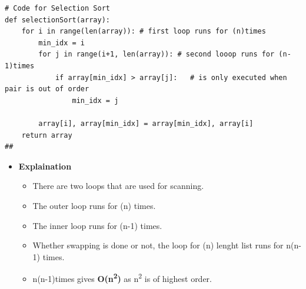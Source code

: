 \documentclass{article}
\begin{document}
\begin{verbatim}
# Code for Selection Sort
def selectionSort(array):
    for i in range(len(array)): # first loop runs for (n)times
        min_idx = i
        for j in range(i+1, len(array)): # second looop runs for (n-1)times
            if array[min_idx] > array[j]:   # is only executed when pair is out of order
                min_idx = j
    
        array[i], array[min_idx] = array[min_idx], array[i]
    return array
##  
\end{verbatim}
\begin{itemize}
    \item \textbf{Explaination}
    \begin{itemize}
        \item There are two loops that are used for scanning.
        \item The outer loop runs for (n) times.
        \item The inner loop runs for (n-1) times.
        \item Whether swapping is done or not, the loop for (n) lenght list runs for n(n-1) times.
        \item n(n-1)times gives \textbf{O(n\textsuperscript{2})} as n\textsuperscript{2} is of highest order.
        \end{itemize}
\end{itemize}


\clearpage
\end{document}
